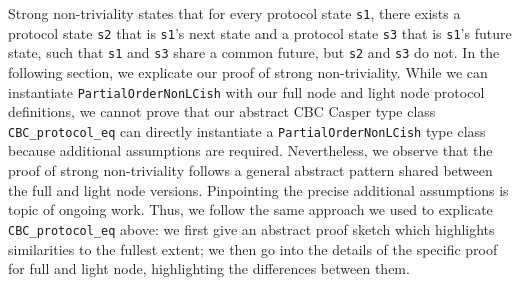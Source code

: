 \documentclass[runningheads]{llncs}
\begin{document}
Strong non-triviality states that for every protocol state \verb|s1|, there exists a protocol state \verb|s2| that is \verb|s1|'s next state and a protocol state \verb|s3| that is \verb|s1|'s future state, such that \verb|s1| and \verb|s3| share a common future, but \verb|s2| and \verb|s3| do not.
In the following section, we explicate our proof of strong non-triviality. While we can instantiate \verb|PartialOrderNonLCish| with our full node and light node protocol definitions, we cannot prove that our abstract CBC Casper type class \verb|CBC_protocol_eq| can directly instantiate a \verb|PartialOrderNonLCish| type class because additional assumptions are required.
Nevertheless, we observe that the proof of strong non-triviality follows a general abstract pattern shared between the full and light node versions. Pinpointing the precise additional assumptions is topic of ongoing work. Thus, we follow the same approach we used to explicate \verb|CBC_protocol_eq| above: we first give an abstract proof sketch which highlights similarities to the fullest extent; we then go into the details of the specific proof for full and light node, highlighting the differences between them.
\end{document}
